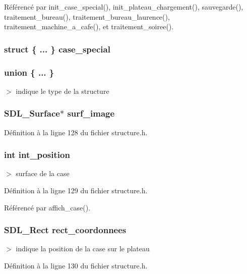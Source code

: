 R\'{e}f\'{e}renc\'{e} par init\_\-case\_\-special(), init\_\-plateau\_\-chargement(), sauvegarde(), traitement\_\-bureau(), traitement\_\-bureau\_\-laurence(), traitement\_\-machine\_\-a\_\-cafe(), et traitement\_\-soiree().
\subsubsection{\setlength{\rightskip}{0pt plus 5cm}struct \{ ... \}  {\bf case\_\-special}}\label{structcases_77ae6afbc6faca1fb5d8ad58c590c7d5}


\subsubsection{\setlength{\rightskip}{0pt plus 5cm}union \{ ... \} }\label{structcases_274259fea8495753b647eca2778ddd40}


$>$ indique le type de la structure 

\subsubsection{\setlength{\rightskip}{0pt plus 5cm}SDL\_\-Surface$\ast$ {\bf surf\_\-image}}\label{structcases_f3f87b368012a35e80ab79e151e25cfd}




D\'{e}finition \`{a} la ligne 128 du fichier structure.h.
\subsubsection{\setlength{\rightskip}{0pt plus 5cm}int {\bf int\_\-position}}\label{structcases_47d7b57cd189c4324a0bc8b338aec618}


$>$ surface de la case 



D\'{e}finition \`{a} la ligne 129 du fichier structure.h.

R\'{e}f\'{e}renc\'{e} par affich\_\-case().
\subsubsection{\setlength{\rightskip}{0pt plus 5cm}SDL\_\-Rect {\bf rect\_\-coordonnees}}\label{structcases_aae7f85c847e6712371285b803ae10e3}


$>$ indique la position de la case sur le plateau 



D\'{e}finition \`{a} la ligne 130 du fichier structure.h.